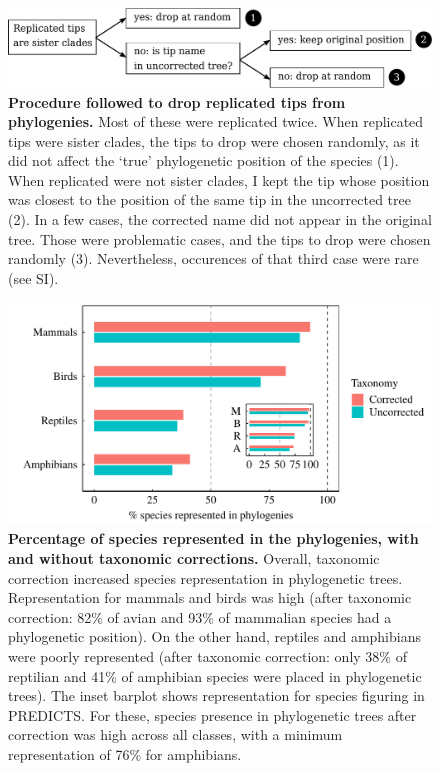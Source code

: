 \begin{figure}[h!]
\centering
\includegraphics[scale=0.7]{figures/chapter2/chart_phylorep}
\caption[Procedure followed to drop replicated tips from phylogenies]{\textbf{Procedure followed to drop replicated tips from phylogenies.} Most of these were replicated twice. When replicated tips were sister clades, the tips to drop were chosen randomly, as it did not affect the `true' phylogenetic position of the species (1). When replicated were not sister clades, I kept the tip whose position was closest to the position of the same tip in the uncorrected tree (2). In a few cases, the corrected name did not appear in the original tree. Those were problematic cases, and the tips to drop were chosen randomly (3). Nevertheless, occurences of that third case were rare (see SI).}
\label{chart_phylorep}
\end{figure}

\begin{figure}[h!]
\centering
\includegraphics[scale=0.7]{figures/chapter2/Species_representation_phylo}
\caption[Percentage of species represented in the phylogenies, with and without taxonomic corrections]{\textbf{Percentage of species represented in the phylogenies, with and without taxonomic corrections.} Overall, taxonomic correction increased species representation in phylogenetic trees. Representation for mammals and birds was high (after taxonomic correction: 82\% of avian and 93\% of mammalian species had a phylogenetic position). On the other hand, reptiles and amphibians were poorly represented (after taxonomic correction: only 38\% of reptilian and 41\% of amphibian species were placed in phylogenetic trees). The inset barplot shows representation for species figuring in PREDICTS. For these, species presence in phylogenetic trees after correction was high across all classes, with a minimum representation of 76\% for amphibians.}
\label{species_rep_phylo}
\end{figure}

